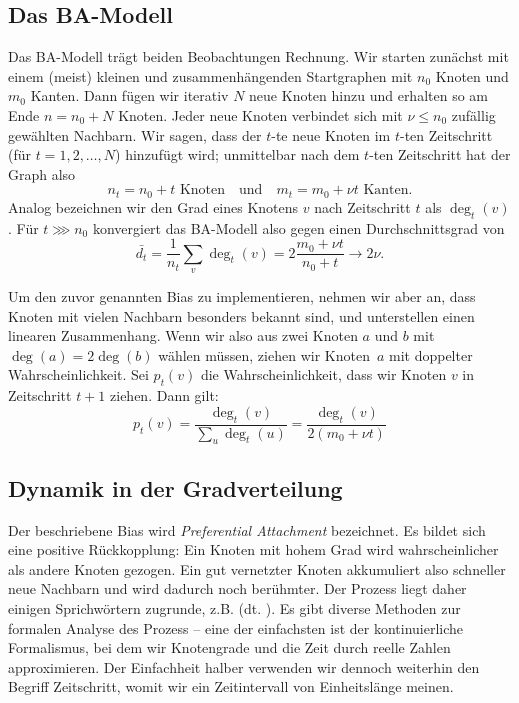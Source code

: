 \subsection{Das BA-Modell}
Das  BA-Modell trägt beiden Beobachtungen Rechnung.
Wir starten zunächst mit einem (meist) kleinen und zusammenhängenden Startgraphen mit $n_0$ Knoten und $m_0$ Kanten.
Dann fügen wir iterativ $N$ neue Knoten hinzu und erhalten so am Ende $n = n_0 + N$ Knoten.
Jeder neue Knoten verbindet sich mit $\nu \le n_0$ zufällig gewählten Nachbarn.
Wir sagen, dass der $t$-te neue Knoten im $t$-ten Zeitschritt (für $t = 1,2, \ldots, N$) hinzufügt wird;
unmittelbar nach dem $t$-ten Zeitschritt hat der Graph also
\begin{equation}
    n_t = n_0 + t \text{ Knoten} \quad \text{und} \quad
    m_t = m_0 + \nu t \text{ Kanten}.
\end{equation}
Analog bezeichnen wir den Grad eines Knotens $v$ nach Zeitschritt $t$ als $\deg_t(v)$.
Für $t \ggg n_0$ konvergiert das BA-Modell also gegen einen Durchschnittsgrad von
\begin{equation}
    \bar{d_t} = \frac{1}{n_t} \sum_{v} \deg_t(v) = 2 \frac{m_0 + \nu t}{n_0 + t} \to 2 \nu.
\end{equation}

Um den zuvor genannten Bias zu implementieren, nehmen wir aber an, dass Knoten mit vielen Nachbarn besonders bekannt sind, und unterstellen einen linearen Zusammenhang.
Wenn wir also aus zwei Knoten $a$ und $b$ mit $\deg(a) = 2\deg(b)$ wählen müssen, ziehen wir Knoten~$a$ mit doppelter Wahrscheinlichkeit.
Sei $p_t(v)$ die Wahrscheinlichkeit, dass wir Knoten $v$ in Zeitschritt $t + 1$ ziehen.
Dann gilt:
\begin{equation}
    p_t(v) = \frac{\deg_t(v)}{\sum_u  \deg_t(u)} = \frac{\deg_t(v)}{2(m_0 + \nu t)}
\end{equation}

\subsection{Dynamik in der Gradverteilung}
Der beschriebene Bias wird \emph{Preferential Attachment} bezeichnet.
Es bildet sich eine positive Rückkopplung:
Ein Knoten mit hohem Grad wird wahrscheinlicher als andere Knoten gezogen.
Ein gut vernetzter Knoten akkumuliert also schneller neue Nachbarn und wird dadurch noch berühmter.
Der Prozess liegt daher einigen Sprichwörtern zugrunde, z.B.  (dt. ).
Es gibt diverse Methoden zur formalen Analyse des Prozess -- eine der einfachsten ist der kontinuierliche Formalismus, bei dem wir Knotengrade und die Zeit durch reelle Zahlen approximieren.
Der Einfachheit halber verwenden wir dennoch weiterhin den Begriff Zeitschritt, womit wir ein Zeitintervall von Einheitslänge meinen.

